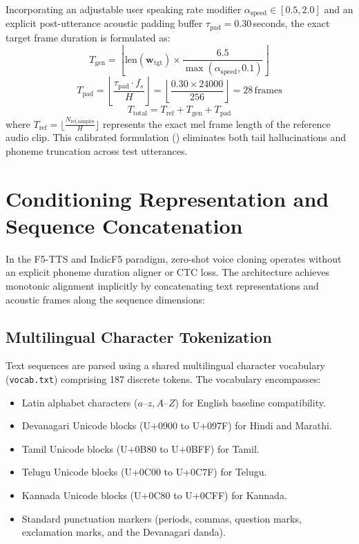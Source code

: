 Incorporating an adjustable user speaking rate modifier $\alpha_{\text{speed}} \in [0.5, 2.0]$ and an explicit post-utterance acoustic padding buffer $\tau_{\text{pad}} = 0.30$\,seconds, the exact target frame duration is formulated as:
\begin{equation}
    T_{\text{gen}} = \left\lfloor \text{len}(\mathbf{w}_{\text{tgt}}) \times \frac{6.5}{\max(\alpha_{\text{speed}}, 0.1)} \right\rfloor
    \label{eq:calibrated_gen_frames}
\end{equation}
\begin{equation}
    T_{\text{pad}} = \left\lfloor \frac{\tau_{\text{pad}} \cdot f_s}{H} \right\rfloor = \left\lfloor \frac{0.30 \times 24000}{256} \right\rfloor = 28\,\text{frames}
    \label{eq:pad_frames}
\end{equation}
\begin{equation}
    T_{\text{total}} = T_{\text{ref}} + T_{\text{gen}} + T_{\text{pad}}
    \label{eq:total_frames}
\end{equation}
where $T_{\text{ref}} = \lfloor \frac{N_{\text{ref\_samples}}}{H} \rfloor$ represents the exact mel frame length of the reference audio clip. This calibrated formulation () eliminates both tail hallucinations and phoneme truncation across test utterances.

\section{Conditioning Representation and Sequence Concatenation}
In the F5-TTS and IndicF5 paradigm, zero-shot voice cloning operates without an explicit phoneme duration aligner or CTC loss. The architecture achieves monotonic alignment implicitly by concatenating text representations and acoustic frames along the sequence dimensions:

\subsection{Multilingual Character Tokenization}
Text sequences are parsed using a shared multilingual character vocabulary (\texttt{vocab.txt}) comprising 187 discrete tokens. The vocabulary encompasses:
\begin{itemize}
    \item Latin alphabet characters ($a\text{--}z, A\text{--}Z$) for English baseline compatibility.
    \item Devanagari Unicode blocks (U+0900 to U+097F) for Hindi and Marathi.
    \item Tamil Unicode blocks (U+0B80 to U+0BFF) for Tamil.
    \item Telugu Unicode blocks (U+0C00 to U+0C7F) for Telugu.
    \item Kannada Unicode blocks (U+0C80 to U+0CFF) for Kannada.
    \item Standard punctuation markers (periods, commas, question marks, exclamation marks, and the Devanagari danda).
\end{itemize}

